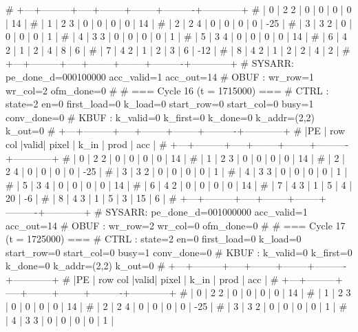# +---+---------+-----+--------+--------+----------+------------+
# | 0 |   2   2 |  0  |      0 |      0 |        0 |         14 |
# | 1 |   2   3 |  0  |      0 |      0 |        0 |         14 |
# | 2 |   2   4 |  0  |      0 |      0 |        0 |        -25 |
# | 3 |   3   2 |  0  |      0 |      0 |        0 |          1 |
# | 4 |   3   3 |  0  |      0 |      0 |        0 |          1 |
# | 5 |   3   4 |  0  |      0 |      0 |        0 |         14 |
# | 6 |   4   2 |  1  |      2 |      4 |        8 |          6 |
# | 7 |   4   2 |  1  |      2 |      3 |        6 |        -12 |
# | 8 |   4   2 |  1  |      2 |      2 |        4 |          2 |
# +---+---------+-----+--------+--------+----------+------------+
# SYSARR: pe_done_d=000100000 acc_valid=1 acc_out=14
# OBUF : wr_row=1 wr_col=2 ofm_done=0
# 
# === Cycle 16  (t = 1715000) ===
# CTRL : state=2 en=0 first_load=0 k_load=0 start_row=0 start_col=0 busy=1 conv_done=0
# KBUF : k_valid=0 k_first=0 k_done=0 k_addr=(2,2) k_out=0
# +---+---------+-----+--------+--------+----------+------------+
# |PE | row col |valid| pixel  |  k_in  |   prod   |    acc     |
# +---+---------+-----+--------+--------+----------+------------+
# | 0 |   2   2 |  0  |      0 |      0 |        0 |         14 |
# | 1 |   2   3 |  0  |      0 |      0 |        0 |         14 |
# | 2 |   2   4 |  0  |      0 |      0 |        0 |        -25 |
# | 3 |   3   2 |  0  |      0 |      0 |        0 |          1 |
# | 4 |   3   3 |  0  |      0 |      0 |        0 |          1 |
# | 5 |   3   4 |  0  |      0 |      0 |        0 |         14 |
# | 6 |   4   2 |  0  |      0 |      0 |        0 |         14 |
# | 7 |   4   3 |  1  |      5 |      4 |       20 |         -6 |
# | 8 |   4   3 |  1  |      5 |      3 |       15 |          6 |
# +---+---------+-----+--------+--------+----------+------------+
# SYSARR: pe_done_d=001000000 acc_valid=1 acc_out=14
# OBUF : wr_row=2 wr_col=0 ofm_done=0
# 
# === Cycle 17  (t = 1725000) ===
# CTRL : state=2 en=0 first_load=0 k_load=0 start_row=0 start_col=0 busy=1 conv_done=0
# KBUF : k_valid=0 k_first=0 k_done=0 k_addr=(2,2) k_out=0
# +---+---------+-----+--------+--------+----------+------------+
# |PE | row col |valid| pixel  |  k_in  |   prod   |    acc     |
# +---+---------+-----+--------+--------+----------+------------+
# | 0 |   2   2 |  0  |      0 |      0 |        0 |         14 |
# | 1 |   2   3 |  0  |      0 |      0 |        0 |         14 |
# | 2 |   2   4 |  0  |      0 |      0 |        0 |        -25 |
# | 3 |   3   2 |  0  |      0 |      0 |        0 |          1 |
# | 4 |   3   3 |  0  |      0 |      0 |        0 |          1 |
